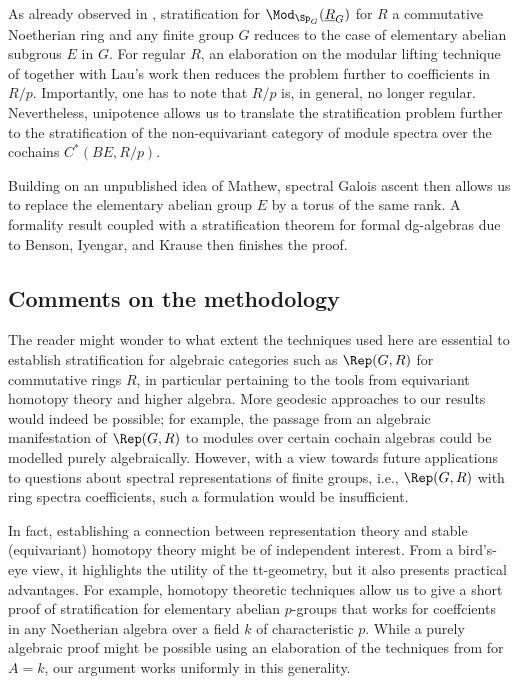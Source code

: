 \documentclass{amsart}%
\numberwithin{equation}{section}%
\theoremstyle{remark}
\begin{document}
As already observed in \cite{barthel_integral1}, stratification for $\Mod_{\Sp_G}(\underline{R}_G)$ for $R$ a commutative Noetherian ring and any finite group $G$ reduces to the case of elementary abelian subgrous $E$ in $G$. For regular $R$, an elaboration on the modular lifting technique of \cite{barthel_integral1} together with Lau's work \cite{lau_spcdmstacks} then reduces the problem further to coefficients in $R/p$. Importantly, one has to note that $R/p$ is, in general, no longer regular. Nevertheless, unipotence allows us to translate the stratification problem further to the stratification of the non-equivariant category of module spectra over the cochains $C^*(BE,R/p)$. 

Building on an unpublished idea of Mathew, spectral Galois ascent then allows us to replace the elementary abelian group $E$ by a torus of the same rank. A formality result coupled with a stratification theorem for formal dg-algebras due to Benson, Iyengar, and Krause then finishes the proof. 

\subsection{Comments on the methodology}

The reader might wonder to what extent the techniques used here are essential to establish stratification for algebraic categories such as $\Rep(G,R)$ for commutative rings $R$, in particular pertaining to the tools from equivariant homotopy theory and higher algebra. More geodesic approaches to our results would indeed be possible; for example, the passage from an algebraic manifestation of $\Rep(G,R)$ to modules over certain cochain algebras could be modelled purely algebraically. However, with a view towards future applications to questions about spectral representations of finite groups, i.e., $\Rep(G,R)$ with ring spectra coefficients, such a formulation would be insufficient. 

In fact, establishing a connection between representation theory and stable (equivariant) homotopy theory might be of independent interest. From a bird's-eye view, it highlights the utility of the tt-geometry, but it also presents practical advantages. For example, homotopy theoretic techniques allow us to give a short proof of stratification for elementary abelian $p$-groups that works for coeffcients in any Noetherian algebra over a field $k$ of characteristic $p$. While a purely algebraic proof might be possible using an elaboration of the techniques from \cite[Sec.~4--8]{BensonIyengarKrause11a} for $A=k$, our argument works uniformly in this generality. 
\end{document}
